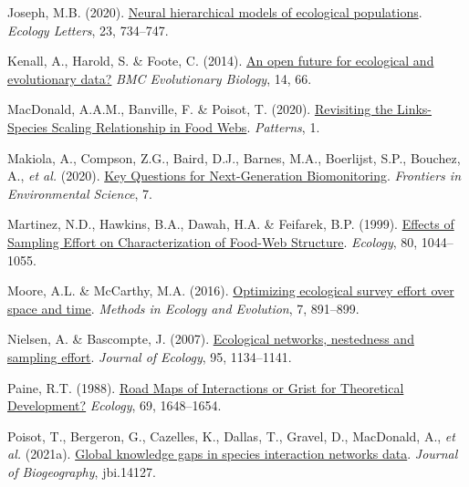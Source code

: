 \documentclass[10pt,oneside]{article}
\newlength{\cslhangindent}
\newenvironment{CSLReferences}[3] %
 {%
  \setlength{\parindent}{0pt}
  \ifodd #1 \everypar{\setlength{\hangindent}{\cslhangindent}}\ignorespaces\fi
  \ifnum #2 > 0
  \setlength{\parskip}{#2\baselineskip}
  \fi
 }%
 {}
\begin{document}
\begin{CSLReferences}{1}{0}
\leavevmode{}%
Joseph, M.B. (2020). \href{https://doi.org/10.1111/ele.13462}{Neural
hierarchical models of ecological populations}. \emph{Ecology Letters},
23, 734--747.

\leavevmode{}%
Kenall, A., Harold, S. \& Foote, C. (2014).
\href{https://doi.org/10.1186/1471-2148-14-66}{An open future for
ecological and evolutionary data?} \emph{BMC Evolutionary Biology}, 14,
66.

\leavevmode{}%
MacDonald, A.A.M., Banville, F. \& Poisot, T. (2020).
\href{https://doi.org/10.1016/j.patter.2020.100079}{Revisiting the
Links-Species Scaling Relationship in Food Webs}. \emph{Patterns}, 1.

\leavevmode{}%
Makiola, A., Compson, Z.G., Baird, D.J., Barnes, M.A., Boerlijst, S.P.,
Bouchez, A., \emph{et al.} (2020).
\href{https://doi.org/10.3389/fenvs.2019.00197}{Key Questions for
Next-Generation Biomonitoring}. \emph{Frontiers in Environmental
Science}, 7.

\leavevmode{}%
Martinez, N.D., Hawkins, B.A., Dawah, H.A. \& Feifarek, B.P. (1999).
\href{https://doi.org/10.1890/0012-9658(1999)080\%5B1044:EOSEOC\%5D2.0.CO;2}{Effects
of Sampling Effort on Characterization of Food-Web Structure}.
\emph{Ecology}, 80, 1044--1055.

\leavevmode{}%
Moore, A.L. \& McCarthy, M.A. (2016).
\href{https://doi.org/10.1111/2041-210X.12564}{Optimizing ecological
survey effort over space and time}. \emph{Methods in Ecology and
Evolution}, 7, 891--899.

\leavevmode{}%
Nielsen, A. \& Bascompte, J. (2007).
\href{https://doi.org/10.1111/j.1365-2745.2007.01271.x}{Ecological
networks, nestedness and sampling effort}. \emph{Journal of Ecology},
95, 1134--1141.

\leavevmode{}%
Paine, R.T. (1988). \href{https://doi.org/10.2307/1941141}{Road Maps of
Interactions or Grist for Theoretical Development?} \emph{Ecology}, 69,
1648--1654.

\leavevmode{}%
Poisot, T., Bergeron, G., Cazelles, K., Dallas, T., Gravel, D.,
MacDonald, A., \emph{et al.} (2021a).
\href{https://doi.org/10.1111/jbi.14127}{Global knowledge gaps in
species interaction networks data}. \emph{Journal of Biogeography},
jbi.14127.


\end{CSLReferences}
\end{document}
